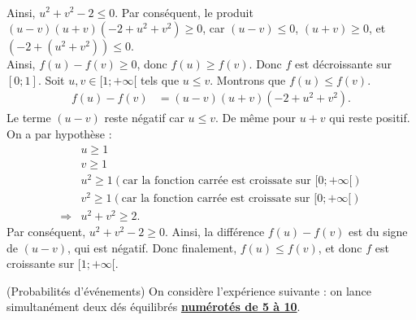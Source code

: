 \documentclass[12pt,
addpoints,
answers,
fleqn
]{exam}
\begin{document}
\begin{questions}
\begin{solution}
\begin{parts}
\begin{subparts}
\begin{align*}
                \end{align*}
                Ainsi, $u^2+v^2 - 2 \leq 0$. Par conséquent, le produit $(u-v)(u+v)(-2+ u^2 + v^2) \geq 0$, car $(u-v)\leq 0$, $(u+v)\geq 0$, et $(-2 + (u^2 +v^2)) \leq 0$.\\
                Ainsi, $f(u)-f(v) \geq 0$, donc $f(u)\geq f(v)$. Donc $f$ est décroissante sur $[0;1]$.
                \subpart Soit $u,v \in [1;+\infty[$ tels que $u \leq v$. Montrons que $f(u) \leq f(v)$.\\
                \begin{align*}
                    f(u)-f(v) & = (u-v)(u+v)(-2+u^2+v^2).
                \end{align*}
                Le terme $(u-v)$ reste négatif car $u\leq v$. De même pour $u+v$ qui reste positif.\\
                On a par hypothèse :
                \begin{align*}
                                & u \geq 1                                                                   \\
                                & v \geq 1                                                                   \\
                                & u^2 \geq 1 (\text{car la fonction carrée est croissate sur $[0;+\infty[$}) \\
                                & v^2\geq 1 (\text{car la fonction carrée est croissate sur $[0;+\infty[$})  \\
                    \Rightarrow & u^2 + v^2 \geq 2.
                \end{align*}
                Par conséquent, $u^2+v^2 -2 \geq 0$. Ainsi, la différence $f(u)-f(v)$ est du signe de $(u-v)$, qui est négatif.
                Donc finalement, $f(u)\leq f(v)$, et donc $f$ est croissante sur $[1;+\infty[$.


            \end{subparts}


        \end{parts}

    \end{solution}




    \question (Probabilités d'événements)
    On considère l'expérience suivante : on lance simultanément deux dés équilibrés \underline{\textbf{numérotés de 5 à 10}}.
\end{questions}
\end{document}
